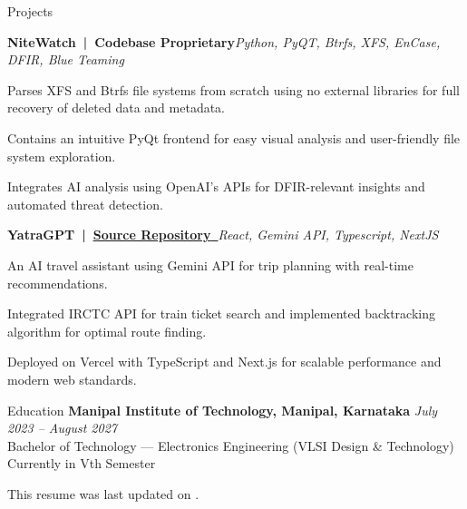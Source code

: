 \documentclass{resume} %
\begin{document}
\begin{rSection}{Projects}

\begin{rSubsection}{\bf NiteWatch~|~Codebase Proprietary}{\em Python, PyQT, Btrfs, XFS, EnCase, DFIR, Blue Teaming}{}{}
\item Parses XFS and Btrfs file systems from scratch using no external libraries for full recovery of deleted data and metadata.
\item Contains an intuitive PyQt frontend for easy visual analysis and user-friendly file system exploration.
\item Integrates AI analysis using OpenAI's APIs for DFIR-relevant insights and automated threat detection.
\end{rSubsection}

\begin{rSubsection}{\bf YatraGPT~|~\href{https://github.com/vee1e/finova}{\underline{Source Repository}~\faGithub}}{\em React, Gemini API, Typescript, NextJS}{}{}
\item An AI travel assistant using Gemini API for trip planning with real-time recommendations.
\item Integrated IRCTC API for train ticket search and implemented backtracking algorithm for optimal route finding.
\item Deployed on Vercel with TypeScript and Next.js for scalable performance and modern web standards.
\end{rSubsection}

\end{rSection}

\begin{rSection}{Education}
    {\bf Manipal Institute of Technology, Manipal, Karnataka} \hfill \textit{July 2023 -- August 2027}  \\
    {Bachelor of Technology --- Electronics Engineering (VLSI Design \& Technology)} \hfill Currently in Vth Semester \\
\end{rSection}

\vspace{-0.8em}
\small \begin{center}This resume was last updated on \DTMnow.\\\end{center}
\end{document}
